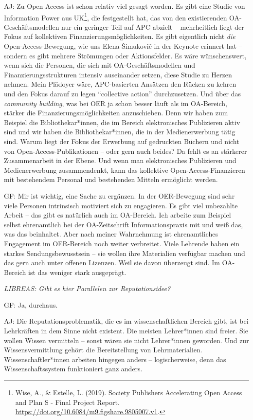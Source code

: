 \documentclass[a4paper,
fontsize=11pt,
oneside,
numbers=noperiodatend,
parskip=half-,
bibliography=totoc,
final
]{scrartcl}
\begin{document}
AJ: Zu Open Access ist schon relativ viel gesagt worden. Es gibt eine
Studie von Information Power aus UK\footnote{Wise, A., \& Estelle, L.
  (2019). Society Publishers Accelerating Open Access and Plan S - Final
  Project Report. \url{https://doi.org/10.6084/m9.figshare.9805007.v1}.},
die festgestellt hat, das von den existierenden OA-Geschäftsmodellen nur
ein geringer Teil auf APC abzielt -- mehrheitlich liegt der Fokus auf
kollektiven Finanzierungsmöglichkeiten. Es gibt eigentlich nicht
\emph{die} Open-Access-Bewegung, wie uns Elena Šimukovič in der Keynote
erinnert hat -- sondern es gibt mehrere Strömungen oder Aktionsfelder.
Es wäre wünschenswert, wenn sich die Personen, die sich mit
OA-Geschäftsmodellen und Finanzierungsstrukturen intensiv auseinander
setzen, diese Studie zu Herzen nehmen. Mein Plädoyer wäre, APC-basierten
Ansätzen den Rücken zu kehren und den Fokus darauf zu legen
\enquote{collective action} durchzusetzen. Und über das \emph{community
building}, was bei OER ja schon besser läuft als im OA-Bereich, stärker
die Finanzierungsmöglichkeiten anzuschieben. Denn wir haben zum Beispiel
die Bibliothekar*innen, die im Bereich elektronisches Publizieren aktiv
sind und wir haben die Bibliothekar*innen, die in der Medienerwerbung
tätig sind. Warum liegt der Fokus der Erwerbung auf gedruckten Büchern
und nicht von Open-Access-Publikationen -- oder gern auch beides? Da
fehlt es an stärkerer Zusammenarbeit in der Ebene. Und wenn man
elektronisches Publizieren und Medienerwerbung zusammendenkt, kann das
kollektive Open-Access-Finanzieren mit bestehendem Personal und
bestehenden Mitteln ermöglicht werden.

GF: Mir ist wichtig, eine Sache zu ergänzen. In der OER-Bewegung sind
sehr viele Personen intrinsisch motiviert sich zu engagieren. Es gibt
viel unbezahlte Arbeit -- das gibt es natürlich auch im OA-Bereich. Ich
arbeite zum Beispiel selbst ehrenamtlich bei der OA-Zeitschrift
Informationspraxis mit und weiß das, was das beinhaltet. Aber nach
meiner Wahrnehmung ist ehrenamtliches Engagement im OER-Bereich noch
weiter verbreitet. Viele Lehrende haben ein starkes Sendungsbewusstsein
-- sie wollen ihre Materialien verfügbar machen und das gern auch unter
offenen Lizenzen. Weil sie davon überzeugt sind. Im OA-Bereich ist das
weniger stark ausgeprägt.

\emph{LIBREAS: Gibt es hier Parallelen zur Reputationsidee?}

GF: Ja, durchaus.

AJ: Die Reputationsproblematik, die es im wissenschaftlichen Bereich
gibt, ist bei Lehrkräften in dem Sinne nicht existent. Die meisten
Lehrer*innen sind freier. Sie wollen Wissen vermitteln -- sonst wären
sie nicht Lehrer*innen geworden. Und zur Wissensvermittlung gehört die
Bereitstellung von Lehrmaterialien. Wissenschaftler*innen arbeiten
hingegen anders -- logischerweise, denn das Wissenschaftssystem
funktioniert ganz anders.
\end{document}
